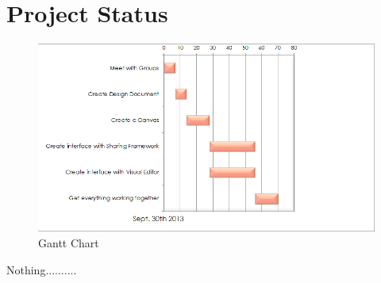 \documentclass[12pt]{article}
\begin{document}
\section{Project Status}

\begin{figure}[ht!]
\centering
\includegraphics{GanttChart.png}
\caption{Gantt Chart}
\label{overflow}
\end{figure}

Nothing..........




%
\end{document}
